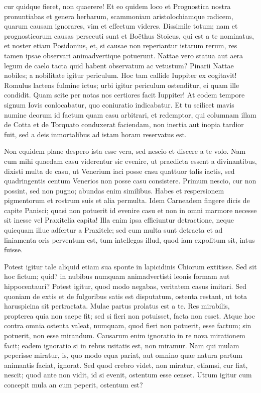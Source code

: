  cur quidque fieret, non quaerere! Et eo quidem loco et Prognostica nostra pronuntiabas et genera herbarum, scammoniam aristolochiamque radicem, quarum causam ignorares, vim et effectum videres. Dissimile totum; nam et prognosticorum causas persecuti sunt et Boëthus Stoicus, qui est a te nominatus, et noster etiam Posidonius, et, si causae non reperiantur istarum rerum, res tamen ipsae observari animadvertique potuerunt. Nattae vero statua aut aera legum de caelo tacta quid habent observatum ac vetustum? Pinarii Nattae nobiles; a nobilitate igitur periculum. Hoc tam callide Iuppiter ex cogitavit! Romulus lactens fulmine ictus; urbi igitur periculum ostenditur, ei quam ille condidit. Quam scite per notas nos certiores facit Iuppiter! At eodem tempore signum Iovis conlocabatur, quo coniuratio indicabatur. Et tu scilicet mavis numine deorum id factum quam casu arbitrari, et redemptor, qui columnam illam de Cotta et de Torquato conduxerat faciendam, non inertia aut inopia tardior fuit, sed a deis inmortalibus ad istam horam reservatus est.

 Non equidem plane despero ista esse vera, sed nescio et discere a te volo. Nam cum mihi quaedam casu viderentur sic evenire, ut praedicta essent a divinantibus, dixisti multa de casu, ut Venerium iaci posse casu quattuor talis iactis, sed quadringentis centum Venerios non posse casu consistere. Primum nescio, cur non possint, sed non pugno; abundas enim similibus. Habes et respersionem pigmentorum et rostrum suis et alia permulta. Idem Carneadem fingere dicis de capite Panisci; quasi non potuerit id evenire casu et non in omni marmore necesse sit inesse vel Praxitelia capita! Illa enim ipsa efficiuntur detractione, neque quicquam illuc adfertur a Praxitele; sed cum multa sunt detracta et ad liniamenta oris perventum est, tum intellegas illud, quod iam expolitum sit, intus fuisse.

 Potest igitur tale aliquid etiam sua sponte in lapicidinis Chiorum extitisse. Sed sit hoc fictum; quid? in nubibus numquam animadvertisti leonis formam aut hippocentauri? Potest igitur, quod modo negabas, veritatem casus imitari. Sed quoniam de extis et de fulgoribus satis est disputatum, ostenta restant, ut tota haruspicina sit pertractata. Mulae partus prolatus est a te. Res mirabilis, propterea quia non saepe fit; sed si fieri non potuisset, facta non esset. Atque hoc contra omnia ostenta valeat, numquam, quod fieri non potuerit, esse factum; sin potuerit, non esse mirandum. Causarum enim ignoratio in re nova mirationem facit; eadem ignoratio si in rebus usitatis est, non miramur. Nam qui mulam peperisse miratur, is, quo modo equa pariat, aut omnino quae natura partum animantis faciat, ignorat. Sed quod crebro videt, non miratur, etiamsi, cur fiat, nescit; quod ante non vidit, id si evenit, ostentum esse censet. Utrum igitur cum concepit mula an cum peperit, ostentum est?

